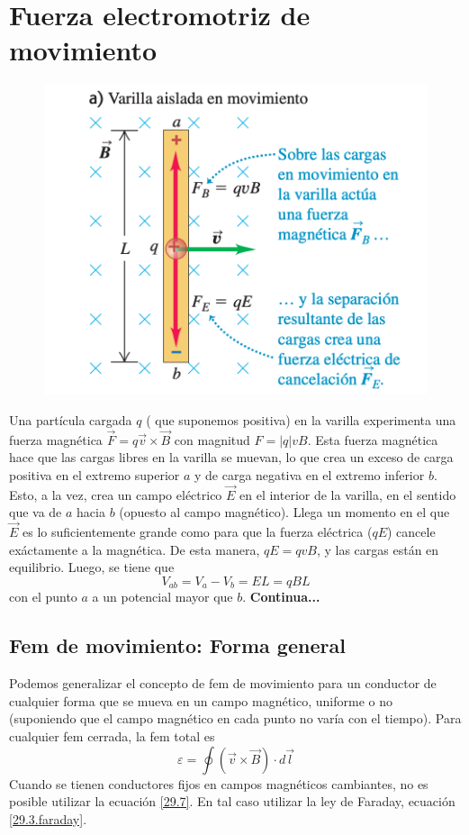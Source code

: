 \section{Fuerza electromotriz de movimiento}
\begin{figure}[h]
\centering
\includegraphics[scale=0.5]{fig/varilla}
\end{figure}
Una partícula cargada $q$ (	que suponemos positiva) en la varilla experimenta una fuerza magnética $\vec{F}=q\vec{v}\times\vec{B}$ con magnitud $F=|q|vB$. Esta fuerza magnética hace que las cargas libres en la varilla se muevan, lo que crea un exceso de carga positiva en el extremo superior $a$ y de carga negativa en el extremo inferior $b$.
Esto, a la vez, crea un campo eléctrico $\vec{E}$ en el interior de la varilla, en el sentido que va de $a$ hacia $b$ (opuesto al campo magnético). Llega un momento en el que $\vec{E}$ es lo suficientemente grande como para que la fuerza eléctrica ($qE$) cancele exáctamente a la magnética. De esta manera, $qE=qvB$, y las cargas están en equilibrio. Luego, se tiene que
\begin{equation}\label{29.5}
V_{ab}=V_a-V_b=EL=qBL
\end{equation}
con el punto $a$ a un potencial mayor que $b$.
\textbf{Continua...}
\subsection{Fem de movimiento: Forma general}
Podemos generalizar el concepto de fem de movimiento para un conductor de cualquier forma que se mueva en un campo magnético, uniforme o no (suponiendo que el campo magnético en cada punto no varía con el tiempo). Para cualquier fem cerrada, la fem total es
\begin{equation}\label{29.7}
\varepsilon=\oint (\vec{v}\times\vec{B})\cdot d\vec{l}
\end{equation}
Cuando se tienen conductores fijos en campos magnéticos cambiantes, no es posible utilizar la ecuación \ref{29.7}. En tal caso utilizar la ley de Faraday, ecuación \ref{29.3.faraday}.


